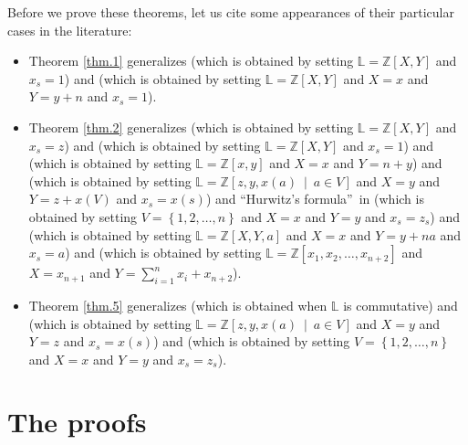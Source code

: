 \documentclass[numbers=enddot,12pt,final,onecolumn,notitlepage]{scrartcl}%
\theoremstyle{definition}
\let\sumnonlimits\sum
\renewcommand{\sum}{\sumnonlimits\limits}
\begin{document}
Before we prove these theorems, let us cite some appearances of their
particular cases in the literature:

\begin{itemize}
\item Theorem \ref{thm.1} generalizes \cite[Problem 4]{qedmo09} (which is
obtained by setting $\mathbb{L}=\mathbb{Z}\left[  X,Y\right]  $ and $x_{s}=1$)
and \cite[\S 1.5, Cauchy's identity]{Riorda68} (which is obtained by setting
$\mathbb{L}=\mathbb{Z}\left[  X,Y\right]  $ and $X=x$ and $Y=y+n$ and
$x_{s}=1$).

\item Theorem \ref{thm.2} generalizes \cite[Chapter III, Theorem B]{Comtet74}
(which is obtained by setting $\mathbb{L}=\mathbb{Z}\left[  X,Y\right]  $ and
$x_{s}=z$) and \cite[Theorem 4]{qedmo09} (which is obtained by setting
$\mathbb{L}=\mathbb{Z}\left[  X,Y\right]  $ and $x_{s}=1$) and \cite[(11)]%
{Kalai79} (which is obtained by setting $\mathbb{L}=\mathbb{Z}\left[
x,y\right]  $ and $X=x$ and $Y=n+y$) and \cite[1.3]{KelPos} (which is obtained
by setting $\mathbb{L}=\mathbb{Z}\left[  z,y,x\left(  a\right)  \ \mid\ a\in
V\right]  $ and $X=y$ and $Y=z+x\left(  V\right)  $ and $x_{s}=x\left(
s\right)  $) and \textquotedblleft Hurwitz's formula\textquotedblright\ in
\cite[solution to Section 1.2.6, Exercise 51]{Knuth97} (which is obtained by
setting $V=\left\{  1,2,\ldots,n\right\}  $ and $X=x$ and $Y=y$ and
$x_{s}=z_{s}$) and \cite[\S 1.5, (13)]{Riorda68} (which is obtained by setting
$\mathbb{L}=\mathbb{Z}\left[  X,Y,a\right]  $ and $X=x$ and $Y=y+na$ and
$x_{s}=a$) and \cite[Exercise 5.31 \textbf{b}]{Stanley-EC2} (which is obtained
by setting $\mathbb{L}=\mathbb{Z}\left[  x_{1},x_{2},\ldots,x_{n+2}\right]  $
and $X=x_{n+1}$ and $Y=\sum_{i=1}^{n}x_{i}+x_{n+2}$).

\item Theorem \ref{thm.5} generalizes \cite[Chapter III, Exercise
20]{Comtet74} (which is obtained when $\mathbb{L}$ is commutative) and
\cite[1.2]{KelPos} (which is obtained by setting $\mathbb{L}=\mathbb{Z}\left[
z,y,x\left(  a\right)  \ \mid\ a\in V\right]  $ and $X=y$ and $Y=z$ and
$x_{s}=x\left(  s\right)  $) and \cite[Section 2.3.4.4, Exercise 30]{Knuth97}
(which is obtained by setting $V=\left\{  1,2,\ldots,n\right\}  $ and $X=x$
and $Y=y$ and $x_{s}=z_{s}$).
\end{itemize}

\section{The proofs}
\end{document}
